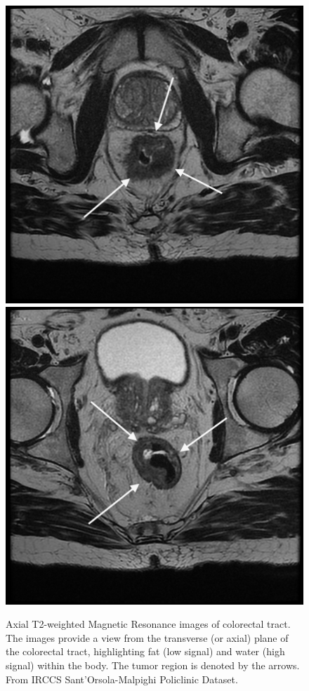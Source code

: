 \documentclass{standalone}
\begin{document}
\begin{figure}[!htp]

    \centering
    \includegraphics[width=.49\textwidth]{../images/BO11_slice_13.png}\hfill
    \includegraphics[width=.49\textwidth]{../images/BO11_slice_5.png}\hfill
    
\caption{Axial T2-weighted Magnetic Resonance images of colorectal tract. The images provide a view from the transverse (or axial) plane of the colorectal tract, highlighting fat (low signal) and water (high signal) within the body. The tumor region is denoted by the arrows.
From IRCCS Sant’Orsola-Malpighi Policlinic Dataset.}
\label{trittico}
    
\end{figure}
\end{document}
